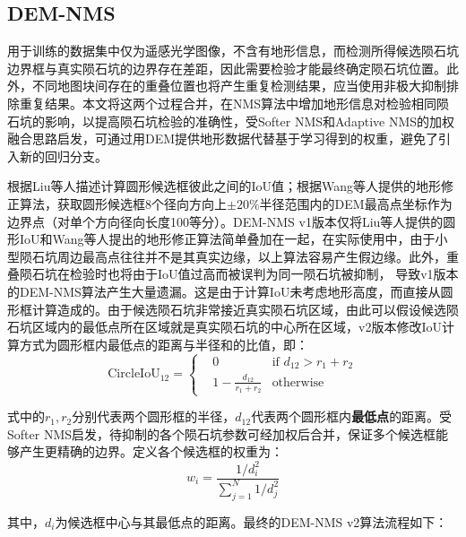 \subsection{DEM-NMS}
用于训练的数据集中仅为遥感光学图像，不含有地形信息，而检测所得候选陨石坑边界框与真实陨石坑的边界存在差距，因此需要检验才能最终确定陨石坑位置。此外，不同地图块间存在的重叠位置也将产生重复检测结果，应当使用非极大抑制排除重复结果。本文将这两个过程合并，在NMS算法中增加地形信息对检验相同陨石坑的影响，以提高陨石坑检验的准确性，受Softer NMS\cite{heSofterNMSRethinkingBounding2018}和Adaptive NMS\cite{liuAdaptiveNMSRefining2019}的加权融合思路启发，可通过用DEM提供地形数据代替基于学习得到的权重，避免了引入新的回归分支。
\par 根据Liu\cite{liuIdentificationLunarCraters2024}等人描述计算圆形候选框彼此之间的IoU值；根据Wang\cite{wangImprovedGlobalCatalog2021}等人提供的地形修正算法，获取圆形候选框8个径向方向上$\pm20\%$半径范围内的DEM最高点坐标作为边界点（对单个方向径向长度100等分）。DEM-NMS v1版本仅将Liu\cite{liuIdentificationLunarCraters2024}等人提供的圆形IoU和Wang\cite{wangImprovedGlobalCatalog2021}等人提出的地形修正算法简单叠加在一起，在实际使用中，由于小型陨石坑周边最高点往往并不是其真实边缘，以上算法容易产生假边缘。此外，重叠陨石坑在检验时也将由于IoU值过高而被误判为同一陨石坑被抑制， 导致v1版本的DEM-NMS算法产生大量遗漏。这是由于计算IoU未考虑地形高度，而直接从圆形框计算造成的。由于候选陨石坑非常接近真实陨石坑区域，由此可以假设候选陨石坑区域内的最低点所在区域就是真实陨石坑的中心所在区域，v2版本修改IoU计算方式为圆形框内最低点的距离与半径和的比值，即：
\begin{equation}
  \mathrm{CircleIoU}_{12}=\left\{\begin{aligned}
    &0 & \text{if } d_{12}>r_1+r_2\\
    &1-\frac{d_{12}}{r_1+r_2} & \text{otherwise}
  \end{aligned}\right.
  \label{eq:circle-iou}
\end{equation}
\par 式中的$r_1,r_2$分别代表两个圆形框的半径，$d_{12}$代表两个圆形框内\textbf{最低点}的距离。受Softer NMS\cite{heSofterNMSRethinkingBounding2018}启发，待抑制的各个陨石坑参数可经加权后合并，保证多个候选框能够产生更精确的边界。定义各个候选框的权重为：
\begin{equation}
  w_i = \frac{1/d_i^2}{\sum_{j=1}^{N}1/d_j^2}
\end{equation}\par
其中，$d_i$为候选框中心与其最低点的距离。最终的DEM-NMS v2算法流程如下：
